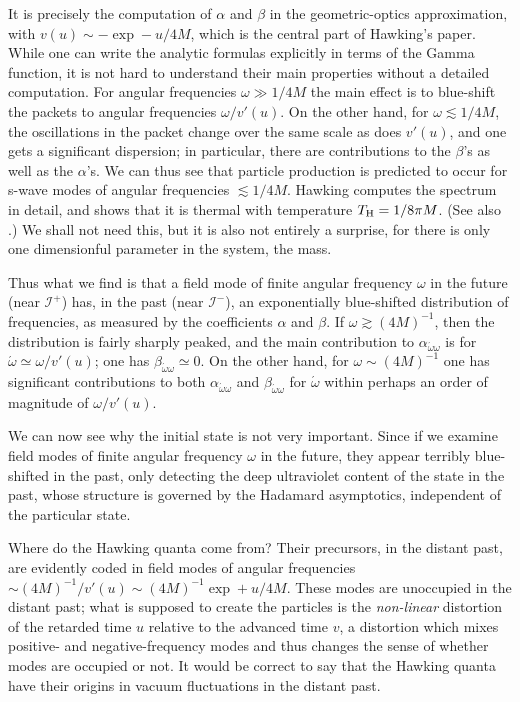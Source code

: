 \documentclass[12pt]{article}
\newcommand{\scrif}{{{\mathscr I}^{+}}}
\newcommand{\scrip}{{{\mathscr I}^{-}}}
\newcommand{\vv}{{v}}
\begin{document}
It is precisely the computation of $\alpha$ and $\beta$ in the geometric-optics approximation, with $\vv (u)\sim -\exp -u/4M$, which is the central part of Hawking's paper.  While one can write the analytic formulas explicitly in terms of the Gamma function, it is not hard to understand their main properties without a detailed computation.  For angular frequencies $\omega \gg 1/4M$ the main effect is to blue-shift the packets to angular frequencies $\omega /\vv '(u)$.  On the other hand, for $\omega \lesssim 1/4M$, the oscillations in the packet change over the same scale as does $\vv '(u)$, and one gets a significant dispersion; in particular, there are contributions to the $\beta$'s as well as the $\alpha$'s.  We can thus see that particle production is predicted to occur for s-wave modes of angular frequencies $\lesssim 1/4M$.
Hawking computes the spectrum in detail, and shows that it is thermal with temperature $T_{\rm H}=1/8\pi M$.  (See also \citet{Wald:1975kc}.)  We shall not need this, but it is also not entirely a surprise, for there is only one dimensionful parameter in the system, the mass.

Thus what we find is that a field mode of finite angular frequency $\omega$ in the future (near $\scrif$) has, in the past (near $\scrip$), an exponentially blue-shifted distribution of frequencies, as measured by the coefficients $\alpha$ and $\beta$.  If $\omega\gtrsim (4M)^{-1}$, then the distribution is fairly sharply peaked, and the main contribution to $\alpha _{\acute\omega \omega}$ is for $\acute\omega\simeq \omega /\vv '(u)$; one has $\beta _{\acute\omega \omega}\simeq 0$.  On the other hand, for $\omega\sim (4M)^{-1}$ one has significant contributions to both $\alpha _{\acute\omega \omega}$ and $\beta _{\acute\omega \omega}$ for $\acute\omega$ within perhaps an order of magnitude of $\omega /\vv '(u)$.

We can now see why the initial state is not very important.  Since if we examine field modes of finite angular frequency $\omega$ in the future, they appear terribly blue-shifted in the past, only detecting the deep ultraviolet content of the state in the past, whose structure is governed by the Hadamard asymptotics, independent of the particular state.

Where do the Hawking quanta come from?  Their precursors, in the distant past, are evidently coded in field modes of 
angular frequencies $\sim (4M)^{-1}/\vv '(u)\sim (4 M)^{-1}\exp +u/4M$.  These modes are unoccupied in the distant past; what is supposed to create the particles is the {\em non-linear} distortion of the retarded time $u$ relative to the advanced time $v$, a distortion which mixes positive- and negative-frequency modes and thus changes the sense of whether modes are occupied or not.
It would be correct to say that the Hawking quanta have their origins in vacuum fluctuations in the distant past.
\end{document}
